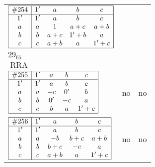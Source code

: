 \documentclass[12pt]{article}
\newcommand\RRA{\operatorname{RRA}}
\newcommand{\join}{\mathbin{+}}%
\newcommand{\id}{{1'}}%
\renewcommand{\div}{0'}
\renewcommand{\top}{1}%
\begin{document}
\begin{center}
\begin{longtable}{l|c|c}
$
\begin{array}{|c|cccc|} \hline
\#254 & \id & a & b & c \\ \hline
\id & \id & a & b & c \\
a & a & \top & a \join c & a \join b \\
b & b & a \join c & \id \join b & a \\
c & c & a \join b & a & \id \join c \\ \hline
\end{array}
$
 & \begin{tabular}{c} yes \\ $29_{65}$ \\ $\RRA$ \end{tabular} 
 & \adjustbox{valign=c, max height=1.6cm}{$
\left[ \begin{array}{cccccc}
\id & a & a & b & c & a \\ 
a & \id & a & a & b & b \\ 
a & a & \id & c & a & c \\ 
b & a & c & \id & a & c \\ 
c & b & a & a & \id & b \\ 
a & b & c & c & b & \id
\end{array}\right]
$}      \\[15mm]

$
\begin{array}{|c|cccc|} \hline
\#255 & \id & a & b & c \\ \hline
\id & \id & a & b & c \\
a & a & -c & \div & b \\
b & b & \div & -c & a \\
c & c & b & a & \id \join c \\ \hline
\end{array}
$
 & no  
 & no      \\[15mm]

$
\begin{array}{|c|cccc|} \hline
\#256 & \id & a & b & c \\ \hline
\id & \id & a & b & c \\
a & a & -b & b \join c & a \join b \\
b & b & b \join c & -c & a \\
c & c & a \join b & a & \id \join c \\ \hline
\end{array}
$
 & no  
 & no      \\[15mm]


\end{longtable}
\end{center}
\end{document}
